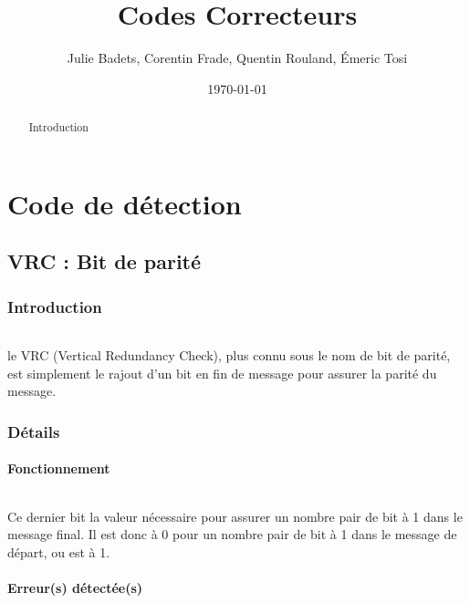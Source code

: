 \documentclass[a4paper,10pt]{report}
\title{Codes Correcteurs}
\author{Julie Badets, Corentin Frade, Quentin Rouland, Émeric Tosi}
\date{\today}
\begin{document}
    \maketitle{}


    \begin{abstract}
        Introduction
    \end{abstract}

    \setcounter{tocdepth}{0}
    \renewcommand{\contentsname}{Sommaire}
    \tableofcontents{}


    \part{Code de détection}


        \chapter{VRC : Bit de parité}
            \section{Introduction}
                \paragraph{}
                    le VRC (Vertical Redundancy Check), plus connu sous le nom de bit de parité,
                    est simplement le rajout d'un bit en fin de message
                    pour assurer la parité du message.
            \newpage
            \section{Détails}
                \subsection{Fonctionnement}
                    \paragraph{}
                        Ce dernier bit la valeur nécessaire pour assurer un nombre pair de bit à 1 dans le message final.
                        Il est donc à 0 pour un nombre pair de bit à 1 dans le message de départ, ou est à 1.
                \subsection{Erreur(s) détectée(s)}
\end{document}
